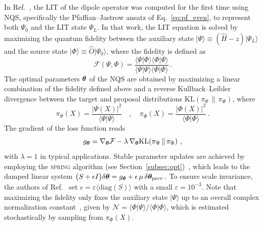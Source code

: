 In Ref.~\cite{parnes_nuclear_2026}, the LIT of the dipole operator was computed for the first time using NQS, specifically the Pfaffian--Jastrow ansatz of Eq.~\eqref{eq:pf_even}, to represent both \( \Psi_0 \) and the LIT state \( \Psi_L \). In that work, the LIT equation is solved by maximizing the quantum fidelity between the auxiliary state
\( \lvert \Psi \rangle \equiv (\hat H - z)\lvert \Psi_L \rangle \)
and the source state
\( \lvert \Phi \rangle \equiv \hat O \lvert \Psi_0 \rangle \),
where the fidelity is defined as~\cite{sinibaldi_unbiasing_2023}
\begin{equation}
\mathcal{F}(\Psi, \Phi) =
\frac{\langle \Psi | \Phi \rangle \langle \Phi | \Psi \rangle}
{\langle \Psi | \Psi \rangle \langle \Phi | \Phi \rangle}\,.
\end{equation}
The optimal parameters $\boldsymbol{\theta}$ of the NQS are obtained by maximizing a linear combination of the fidelity defined above and a reverse Kullback--Leibler divergence between the target and proposal distributions $\mathrm{KL}\!\left(\pi_{\Psi}\,\|\,\pi_\Phi\right)$,
where 
\begin{equation}
\pi_{\Psi}(X)=\frac{|\Psi(X)|^2}{\langle\Psi|\Psi\rangle}\quad , \quad \pi_\Phi(X)=\frac{|\Phi(X)|^2}{\langle\Phi|\Phi\rangle}\, .
\end{equation}
The gradient of the loss function reads
\begin{equation}
g_{\boldsymbol{\theta}}=\nabla_{\boldsymbol{\theta}}\mathcal{F}
-\lambda\,\nabla_{\boldsymbol{\theta}}\mathrm{KL}\!\left(\pi_{\Psi}\,\|\,\pi_\Phi\right)\,,
\end{equation}
with \( \lambda=1 \) in typical applications.
Stable parameter updates are achieved by employing the \textsc{spring} algorithm (see Section~\ref{subsec:opt})~\cite{goldshlager_kaczmarz-inspired_2024}, which leads to the damped linear system
\(
\bigl(S+\epsilon I\bigr)\delta{\boldsymbol{\theta}}
=g_{\boldsymbol{\theta}}+\epsilon\,\mu\,\delta{\boldsymbol{\theta}}_{\text{prev}}\,.
\)
To ensure scale invariance, the authors of Ref.~\cite{parnes_nuclear_2026} set \( \epsilon=\varepsilon\langle\mathrm{diag}(S)\rangle \)
with a small \( \varepsilon=10^{-3} \).
Note that maximizing the fidelity only fixes the auxiliary state $|\Psi\rangle$ up to an overall complex normalization constant~\cite{hendry_machine_2019}, given by $\mathcal{N} = \langle \Phi | \Psi\rangle / \langle \Phi | \Phi \rangle$, which is estimated stochastically by sampling from $\pi_{\Phi}(X)$. 






